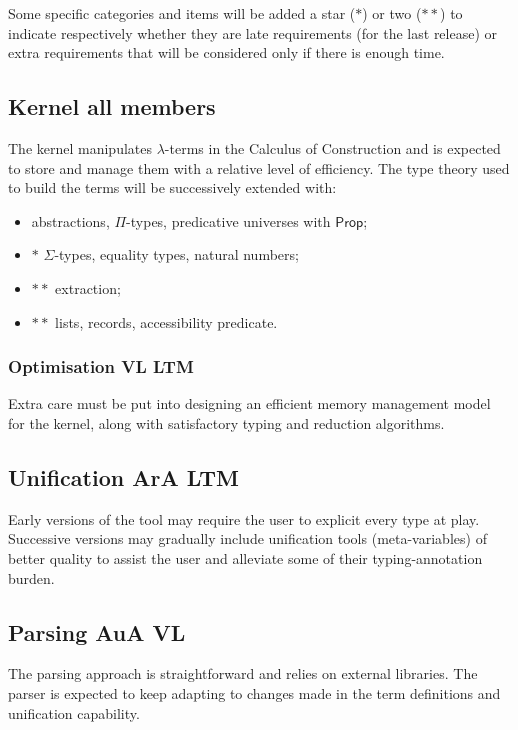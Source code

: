 \documentclass[twocolumn]{article}
\begin{document}
Some specific categories and items will be added a star (\(*\)) or two (\(**\)) to
indicate respectively whether they are late requirements (for the last release)
or extra requirements that will be considered only if there is enough time.


\subsection{Kernel  \hfill\scriptsize all members}
The kernel manipulates \(\lambda\)-terms in the Calculus of Construction and is
expected to store and manage them with a relative level of efficiency.
The type theory used to build the terms will be successively extended with:
\begin{itemize}
  \item abstractions, \(\Pi\)-types, predicative universes with \(\mathsf{Prop}\);
  \item \(*\) \(\Sigma\)-types, equality types, natural numbers;
  \item \(**\) extraction;
  \item \(**\) lists, records, accessibility predicate.
\end{itemize}

\subsubsection{Optimisation \hfill\scriptsize VL LTM}
Extra care must be put into designing an efficient memory management model for
the kernel, along with satisfactory typing and reduction algorithms.


\subsection{Unification \hfill\scriptsize ArA LTM}
Early versions of the tool may require the user to explicit every type at play.
Successive versions may gradually include unification tools (meta-variables)
of better quality to assist the user and alleviate some of their typing-annotation
burden.



\subsection{Parsing \hfill\scriptsize AuA VL}
The parsing approach is straightforward and relies on external libraries. The
parser is expected to keep adapting to changes made in the term definitions and
unification capability.
\end{document}

